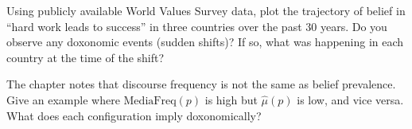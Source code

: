 \begin{exercise}
Using publicly available World Values Survey data, plot the trajectory of belief in ``hard work leads to success'' in three countries over the past 30 years.
Do you observe any doxonomic events (sudden shifts)?
If so, what was happening in each country at the time of the shift?
\end{exercise}

\begin{exercise}
The chapter notes that discourse frequency is not the same as belief prevalence.
Give an example where $\mathrm{MediaFreq}(p)$ is high but $\hat{\mu}(p)$ is low, and vice versa.
What does each configuration imply doxonomically?
\end{exercise}
